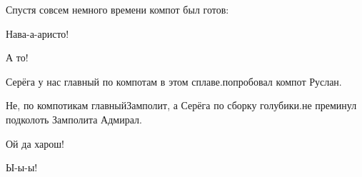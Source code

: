 Спустя совсем немного времени компот был готов:

\diagdash Нава-а-аристо!

\diagdash А то!

\diagdash Серёга у нас главный по компотам в этом сплаве.\mdash попробовал компот Руслан.

\diagdash Не, по компотикам главный\mdash Замполит, а Серёга по сборку голубики.\mdash не преминул подколоть Замполита Адмирал.

\diagdash Ой да харош!

\diagdash Ы-ы-ы!






\begin{center}
\end{center}
